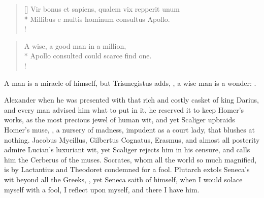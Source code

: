 {\settowidth{\versewidth}{Vir bonus et sapiens, qualem vix repperit unum}
\begin{verse}[\versewidth]
\textlatin{Vir bonus et sapiens, qualem vix repperit unum}\\*
\textlatin{Millibus e multis hominum consultus Apollo.}\\!
\end{verse}

\begin{verse}
A wise, a good man in a million,\\*
Apollo consulted could scarce find one.\\!
\end{verse}

A man is a miracle of himself, but Trismegistus adds, , a wise man is a wonder: .

Alexander when he was presented with that rich and costly casket of
king Darius, and every man advised him what to put in it, he reserved
it to keep Homer's works, as the most precious jewel of human wit, and
yet  Scaliger upbraids Homer's muse, ,
a nursery of madness, impudent as a court lady, that blushes at
nothing. Jacobus Mycillus, Gilbertus Cognatus, Erasmus, and almost all
posterity admire Lucian's luxuriant wit, yet Scaliger rejects him in
his censure, and calls him the Cerberus of the muses. Socrates, whom
all the world so much magnified, is by Lactantius and Theodoret
condemned for a fool. Plutarch extols Seneca's wit beyond all the
Greeks, , yet  Seneca saith of himself, when I would
solace myself with a fool, I reflect upon myself, and there I have him.

}
